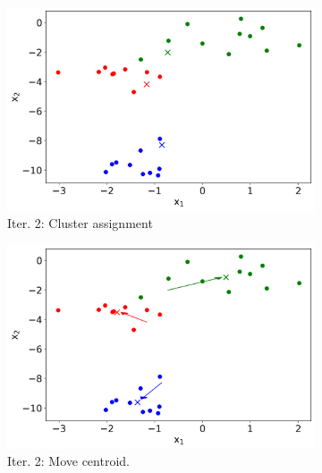 \begin{figure}
\begin{subfigure}[b]{0.48\textwidth}
         \includegraphics[width=\textwidth]{"Part 3 - Learning Systems/Unsupervised Learning/k-Means/images/CA2.png"}
         \caption{Iter. 2: Cluster assignment}
         \label{fig:k-means-loop-2-ca}
     \end{subfigure}
     \hfill
     \begin{subfigure}[b]{0.48\textwidth}
         \centering
         \includegraphics[width=\textwidth]{"Part 3 - Learning Systems/Unsupervised Learning/k-Means/images/MC2.png"}
         \caption{Iter. 2: Move centroid.}
         \label{fig:k-means-loop-2-mc}
     \end{subfigure}
     \hfill
     \begin{subfigure}[b]{0.48\textwidth}
         \centering

\end{subfigure}
\end{figure}
